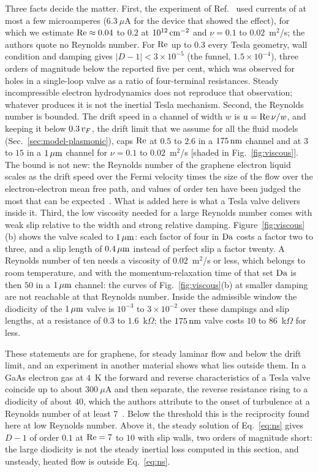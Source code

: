 Three facts decide the matter. First, the experiment of
Ref.~\cite{geurs2020rectification} used currents of at most a few
microamperes ($6.3\ \mu$A for the device that showed the effect), for
which we estimate $\mathrm{Re}\approx0.04$ to $0.2$ at $10^{12}\,\mathrm{cm^{-2}}$ and
$\nu=0.1$ to $0.02$~m$^{2}$/s; the authors quote no Reynolds number. For
$\mathrm{Re}$ up to $0.3$ every Tesla geometry, wall condition and damping gives
$|D-1|<3\times10^{-5}$ (the funnel, $1.5\times10^{-4}$), three orders of
magnitude below the reported five per cent, which was observed for holes in a single-loop valve as a ratio of
four-terminal resistances. Steady incompressible
electron hydrodynamics does not reproduce that observation; whatever
produces it is not the inertial Tesla mechanism. Second, the Reynolds number is bounded.
The drift speed in a channel of width $w$ is $u=\mathrm{Re}\,\nu/w$, and keeping it
below $0.3\,v_{F}$, the drift limit that we assume for all the fluid models
(Sec.~\ref{sec:model-plasmonic}), caps
$\mathrm{Re}$ at $0.5$ to $2.6$ in a $175\,\mathrm{nm}$ channel and at $3$ to $15$ in a
$1\,\mu\mathrm{m}$ channel for $\nu=0.1$ to $0.02$~m$^{2}$/s [shaded in
Fig.~\ref{fig:viscous}]. The bound is not new: the Reynolds number of the
graphene electron liquid scales as the drift speed over the Fermi velocity
times the size of the flow over the electron-electron mean free path, and
values of order ten have been judged the most that can be
expected~\cite{muller2009graphene,lucas2018hydrodynamics}. What is added
here is what a Tesla valve delivers inside it. Third, the low viscosity needed for a large
Reynolds number comes with weak slip relative to the width and strong
relative damping. Figure~\ref{fig:viscous}(b) shows the valve scaled to
$1\,\mu\mathrm{m}$: each factor of four in $\mathrm{Da}$ costs a factor two to three, and a
slip length of $0.4\,\mu\mathrm{m}$ instead of perfect slip a factor twenty. A
Reynolds number of ten needs a viscosity of $0.02$~m$^{2}$/s or less,
which belongs to room temperature, and with the momentum-relaxation time
of that set $\mathrm{Da}$ is then $50$ in a $1\,\mu\mathrm{m}$ channel: the curves of
Fig.~\ref{fig:viscous}(b) at smaller damping are not reachable at that
Reynolds number. Inside the
admissible window the diodicity of the $1\,\mu\mathrm{m}$ valve is $10^{-3}$ to
$3\times10^{-2}$ over these dampings and slip lengths, at a
resistance of $0.3$ to $1.6$~k$\Omega$; the $175\,\mathrm{nm}$ valve costs $10$ to
$86$~k$\Omega$ for less.

These statements are for graphene, for steady laminar flow and below the
drift limit, and an experiment in another material shows what lies outside
them. In a GaAs electron gas at $4$~K
the forward and reverse characteristics of a Tesla valve coincide up to
about $300\ \mu$A and then separate, the reverse resistance rising to a
diodicity of about $40$, which the authors attribute to the onset of
turbulence at a Reynolds number of at least
$7$~\cite{sarypov2026electron}. Below the threshold this is the
reciprocity found here at low Reynolds number. Above it, the steady
solution of Eq.~\eqref{eq:ns} gives $D-1$ of order $0.1$ at $\mathrm{Re}=7$ to
$10$ with slip walls, two orders of magnitude short: the large diodicity
is not the steady inertial loss computed in this
section, and unsteady, heated flow is outside Eq.~\eqref{eq:ns}.

